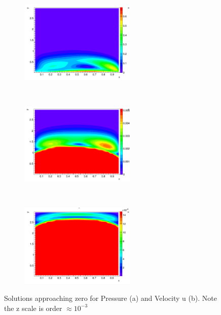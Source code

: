 \documentclass[paper=a4, fontsize=11pt, abstract=on]{scrartcl}
\numberwithin{equation}{section}		%
\numberwithin{figure}{section}			%
\numberwithin{table}{section}				%
\begin{document}
\begin{figure}[H]
        \centering
        \begin{subfigure}[h]{0.5\textwidth}
        \centering
                \includegraphics[width = 5.5cm]{v1}
                \caption{}				
        \end{subfigure}%
       ~~~~~
        \begin{subfigure}[h]{0.5\textwidth}
        \centering
                \includegraphics[width = 5.5cm]{v2}
                \caption{}               
        \end{subfigure}       
         ~~~~~
        \begin{subfigure}[h]{0.5\textwidth}
        \centering
                \includegraphics[width = 5.5cm]{v3}
                \caption{}               
        \end{subfigure}
        \caption{Solutions approaching zero for Pressure (a) and Velocity u (b). Note the z scale is order $\approx 10^{-3}$ }
        \label{zero1}
\end{figure}
\end{document}
